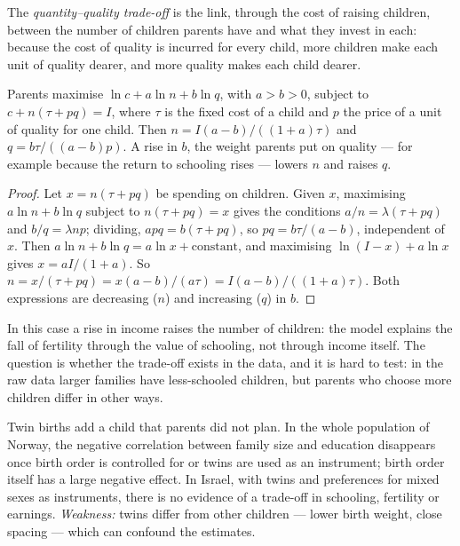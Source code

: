 \begin{definition}\label{def:b3:demographic-transition:quantity-quality}
The \emph{quantity--quality trade-off} is the link, through the cost of raising
children, between the number of children parents have and what they invest in each:
because the cost of quality is incurred for every child, more children make each
unit of quality dearer, and more quality makes each child dearer.
\end{definition}

\begin{proposition}\label{prop:b3:demographic-transition:becker-lewis}
Parents maximise $\ln c + a\ln n + b\ln q$, with $a > b > 0$, subject to $c + n(\tau + pq) = I$, where $\tau$ is the fixed cost of a
child and $p$ the price of a unit of quality for one child. Then $n = I(a - b)/((1 + a)\tau)$ and $q = b\tau/((a - b)p)$. A rise
in $b$, the weight parents put on quality --- for example because the return to
schooling rises --- lowers $n$ and raises $q$.
\end{proposition}

\begin{proof}
Let $x = n(\tau + pq)$ be spending on children. Given $x$, maximising $a\ln n + b\ln q$ subject to $n(\tau + pq) = x$ gives the conditions
$a/n = \lambda(\tau + pq)$ and $b/q = \lambda np$; dividing, $a pq = b(\tau + pq)$, so $pq = b\tau/(a - b)$, independent of $x$. Then
$a\ln n + b\ln q = a\ln x + \text{constant}$, and maximising $\ln(I - x) + a\ln x$ gives $x = aI/(1 + a)$. So $n = x/(\tau + pq) = x(a - b)/(a\tau) = I(a - b)/((1 + a)\tau)$. Both expressions
are decreasing ($n$) and increasing ($q$) in $b$.
\end{proof}

In this case a rise in income raises the number of children: the model explains the
fall of fertility through the value of schooling, not through income itself. The
question is whether the trade-off exists in the data, and it is hard to test: in
the raw data larger families have less-schooled children, but parents who choose
more children differ in other ways.

\begin{record}
Twin births add a child that parents did not plan. In the whole population of
Norway, the negative correlation between family size and education disappears once
birth order is controlled for or twins are used as an instrument; birth order
itself has a large negative effect. %
In Israel, with twins and preferences for mixed sexes as instruments, there is no
evidence of a trade-off in schooling, fertility or earnings. %
\emph{Weakness:} twins differ from other children --- lower birth weight, close
spacing --- which can confound the estimates.
\end{record}

